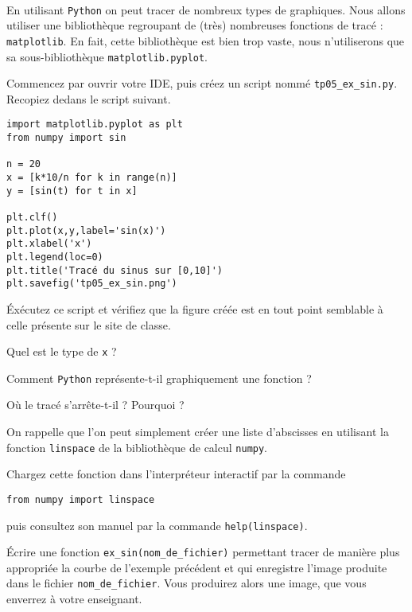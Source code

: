 \exer{[PLT-004]}
\setcounter{numques}{0}~\\

En utilisant \texttt{Python}{} on peut tracer de nombreux types de graphiques. 
Nous allons utiliser une bibliothèque regroupant de (très) nombreuses fonctions de tracé : \texttt{matplotlib}.
En fait, cette bibliothèque est bien trop vaste, nous n'utiliserons que sa sous-bibliothèque \texttt{matplotlib.pyplot}.

Commencez par ouvrir votre IDE, puis créez un script nommé \texttt{tp05\_ex\_sin.py}. Recopiez dedans le script suivant. 
\begin{lstlisting}
import matplotlib.pyplot as plt
from numpy import sin

n = 20
x = [k*10/n for k in range(n)]
y = [sin(t) for t in x]

plt.clf()
plt.plot(x,y,label='sin(x)')
plt.xlabel('x')
plt.legend(loc=0)
plt.title('Tracé du sinus sur [0,10]')
plt.savefig('tp05_ex_sin.png')
\end{lstlisting}
\'Exécutez ce script et vérifiez que la figure créée est en tout point semblable à celle présente sur le site de classe. 

\medskip{}

\question{} Quel est le type de \texttt{x} ?

\medskip{}

\question{} Comment \texttt{Python}{} représente-t-il graphiquement une fonction ? 

\medskip{}

\question{} Où le tracé s'arrête-t-il ? Pourquoi ? 

\medskip{}

On rappelle que l'on peut simplement créer une liste d'abscisses en utilisant la fonction \texttt{linspace} de la bibliothèque de calcul \texttt{numpy}. 

Chargez cette fonction dans l'interpréteur interactif par la commande 
\begin{lstlisting}
from numpy import linspace
\end{lstlisting}
puis consultez son manuel par la commande \texttt{help(linspace)}. 

\medskip{}

\question{}\label{tp05:qu:sin2} Écrire une fonction \texttt{ex\_sin(nom\_de\_fichier)} permettant tracer de manière plus appropriée la courbe de l'exemple précédent et qui enregistre l'image produite dans le fichier \texttt{nom\_de\_fichier}. 
Vous produirez alors une image, que vous enverrez à votre enseignant. 

